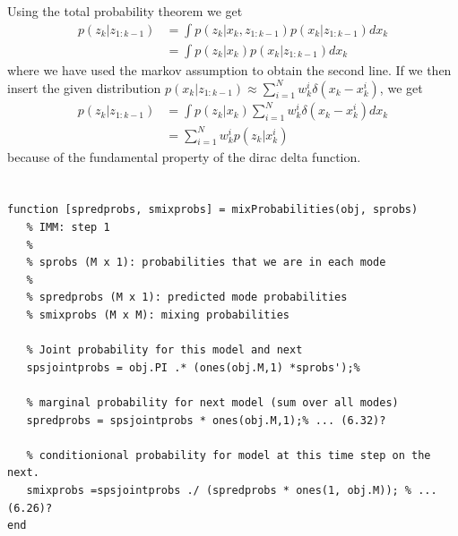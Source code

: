 \documentclass[]{article}
\begin{document}
\subsection{}
Using the total probability theorem we get
\begin{equation}\begin{aligned}
p(z_k | z_{1:k-1})
&= \int p(z_k | x_k, z_{1:k-1}) p(x_k | z_{1:k-1})dx_k \\
&= \int p(z_k | x_k) p(x_k | z_{1:k-1})dx_k
\end{aligned}\end{equation}
where we have used the markov assumption to obtain the second line. If we then insert the given distribution $p(x_k | z_{1:k-1}) \approx \sum_{i=1}^{N}w^i_k \delta(x_k - x_k^i)$, we get
\begin{equation}\begin{aligned}
p(z_k | z_{1:k-1})
&= \int p(z_k|x_k)  \sum_{i=1}^{N}w^i_k \delta(x_k - x_k^i) dx_k \\
&= \sum_{i=1}^{N}w^i_k p(z_k | x_k^i)
\end{aligned}\end{equation}
because of the fundamental property of the dirac delta function.

\section{}
\subsection{}
\begin{lstlisting}[caption={IMM Step 1}]
function [spredprobs, smixprobs] = mixProbabilities(obj, sprobs)
   % IMM: step 1
   %
   % sprobs (M x 1): probabilities that we are in each mode
   %
   % spredprobs (M x 1): predicted mode probabilities
   % smixprobs (M x M): mixing probabilities

   % Joint probability for this model and next
   spsjointprobs = obj.PI .* (ones(obj.M,1) *sprobs');%

   % marginal probability for next model (sum over all modes)
   spredprobs = spsjointprobs * ones(obj.M,1);% ... (6.32)?

   % conditionional probability for model at this time step on the next.
   smixprobs =spsjointprobs ./ (spredprobs * ones(1, obj.M)); % ... (6.26)?
end
\end{lstlisting}
\end{document}
